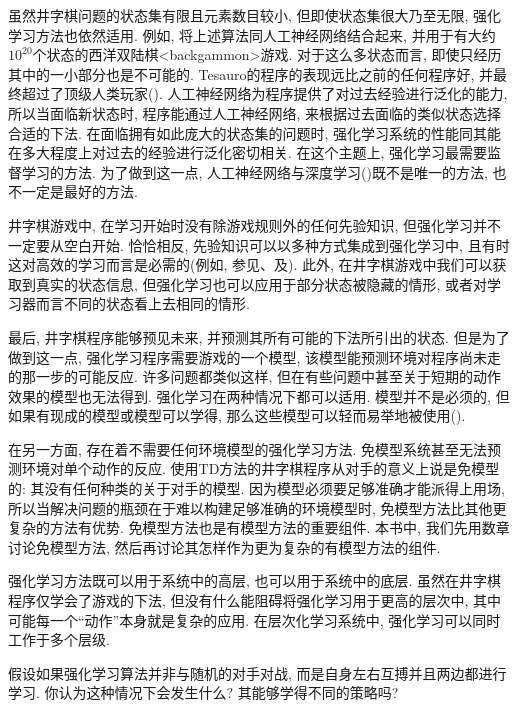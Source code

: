 虽然井字棋问题的状态集有限且元素数目较小, 但即使状态集很大乃至无限, 强化学习方法也依然适用. 例如, \citet{Tesauro1992, Tesauro1995}将上述算法同人工神经网络结合起来, 并用于有大约${10}^{20}$个状态的西洋双陆棋<backgammon>游戏. 对于这么多状态而言, 即使只经历其中的一小部分也是不可能的. Tesauro的程序的表现远比之前的任何程序好, 并最终超过了顶级人类玩家(). 人工神经网络为程序提供了对过去经验进行泛化的能力, 所以当面临新状态时, 程序能通过人工神经网络, 来根据过去面临的类似状态选择合适的下法. 在面临拥有如此庞大的状态集的问题时, 强化学习系统的性能同其能在多大程度上对过去的经验进行泛化密切相关. 在这个主题上, 强化学习最需要监督学习的方法. 为了做到这一点, 人工神经网络与深度学习()既不是唯一的方法, 也不一定是最好的方法.

井字棋游戏中, 在学习开始时没有除游戏规则外的任何先验知识, 但强化学习并不一定要从空白开始. 恰恰相反, 先验知识可以以多种方式集成到强化学习中, 且有时这对高效的学习而言是必需的(例如, 参见、及). 此外, 在井字棋游戏中我们可以获取到真实的状态信息, 但强化学习也可以应用于部分状态被隐藏的情形, 或者对学习器而言不同的状态看上去相同的情形.

最后, 井字棋程序能够预见未来, 并预测其所有可能的下法所引出的状态. 但是为了做到这一点, 强化学习程序需要游戏的一个模型, 该模型能预测环境对程序尚未走的那一步的可能反应. 许多问题都类似这样, 但在有些问题中甚至关于短期的动作效果的模型也无法得到. 强化学习在两种情况下都可以适用. 模型并不是必须的, 但如果有现成的模型或模型可以学得, 那么这些模型可以轻而易举地被使用().

在另一方面, 存在着不需要任何环境模型的强化学习方法. 免模型系统甚至无法预测环境对单个动作的反应. 使用TD方法的井字棋程序从对手的意义上说是免模型的: 其没有任何种类的关于对手的模型. 因为模型必须要足够准确才能派得上用场, 所以当解决问题的瓶颈在于难以构建足够准确的环境模型时, 免模型方法比其他更复杂的方法有优势. 免模型方法也是有模型方法的重要组件. 本书中, 我们先用数章讨论免模型方法, 然后再讨论其怎样作为更为复杂的有模型方法的组件.

强化学习方法既可以用于系统中的高层, 也可以用于系统中的底层. 虽然在井字棋程序仅学会了游戏的下法, 但没有什么能阻碍将强化学习用于更高的层次中, 其中可能每一个``动作''本身就是复杂的应用. 在层次化学习系统中, 强化学习可以同时工作于多个层级.

\begin{exer}[左右互搏]
假设如果强化学习算法并非与随机的对手对战, 而是自身左右互搏并且两边都进行学习. 你认为这种情况下会发生什么? 其能够学得不同的策略吗?
\end{exer}

